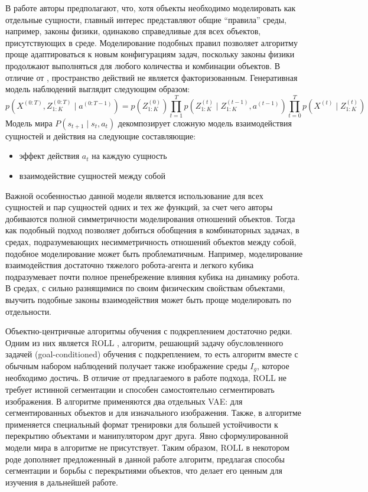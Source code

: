 В работе \cite{OP3} авторы предполагают, что, хотя объекты необходимо моделировать как отдельные сущности, главный интерес представляют общие ``правила'' среды, например, законы физики, одинаково справедливые для всех объектов, присутствующих в среде. 
Моделирование подобных правил позволяет алгоритму проще адаптироваться к новым конфигурациям задач, поскольку законы физики продолжают выполняться для любого количества и комбинации объектов.
В отличие от \cite{cswm}, пространство действий не является факторизованным.
Генеративная модель наблюдений выглядит следующим образом:
\begin{equation}
    p\left(X^{(0: T)}, Z_{1: K}^{(0: T)} \mid a^{(0: T-1)}\right)=p\left(Z_{1: K}^{(0)}\right) \prod_{t=1}^{T} p\left(Z_{1: K}^{(t)} \mid Z_{1: K}^{(t-1)}, a^{(t-1)}\right) \prod_{t=0}^{T} p\left(X^{(t)} \mid Z_{1: K}^{(t)}\right)
\end{equation}
Модель мира $P(s_{t+1} \mid s_t, a_t)$ декомпозирует сложную модель взаимодействия сущностей и действия на следующие составляющие:
\begin{itemize}
    \item эффект действия $a_t$ на каждую сущность
    \item взаимодействие сущностей между собой
\end{itemize}
Важной особенностью данной модели является использование для всех сущностей и пар сущностей одних и тех же функций, за счет чего авторы добиваются полной симметричности моделирования отношений объектов.
Тогда как подобный подход позволяет добиться обобщения в комбинаторных задачах, в средах, подразумевающих несимметричность отношений объектов между собой, подобное моделирование может быть проблематичным. 
Например, моделирование взаимодействия достаточно тяжелого робота-агента и легкого кубика подразумевает почти полное пренебрежение влияния кубика на динамику робота. 
В средах, с сильно разнящимися по своим физическим свойствам объектами, выучить подобные законы взаимодействия может быть проще моделировать по отдельности.

Объектно-центричные алгоритмы обучения с подкреплением достаточно редки.
Одним из них является ROLL \cite{ROLL}, алгоритм, решающий задачу обусловленного задачей (goal-conditioned) обучения с подкреплением, то есть алгоритм вместе с обычным набором наблюдений получает также изображение среды $\mathit{I}_g$, которое необходимо достичь. В отличие от предлагаемого в работе подхода, ROLL не требует истинной сегментации и способен самостоятельно сегментировать изображения. В алгоритме применяются два отдельных VAE: для сегментированных объектов и для изначального изображения. Также, в алгоритме применяется специальный формат тренировки для большей устойчивости к перекрытию объектами и манипулятором друг друга. Явно сформулированной модели мира в алгоритме не присутствует.
Таким образом, ROLL в некотором роде дополняет предложенный в данной работе алгоритм, предлагая способы сегментации и борьбы с перекрытиями объектов, что делает его ценным для изучения в дальнейшей работе.

